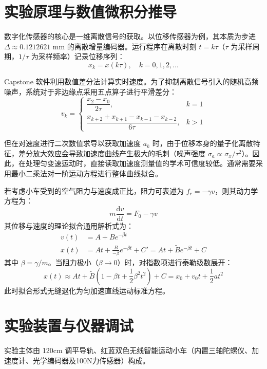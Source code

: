 \documentclass[twocolumn,zihao=5,a4paper]{ctexart} %
\begin{document}
	\section{实验原理与数值微积分推导}
	数字化传感器的核心是一维离散信号的获取。以位移传感器为例，其本质为步进 $\Delta \approx 0.1212621\text{ mm}$ 的离散增量编码器。运行程序在离散时刻 $t = k\tau$（$\tau$ 为采样周期，$1/\tau$ 为采样频率）记录位移序列：
	\begin{equation}
		x_k = x(k\tau), \quad k = 0, 1, 2, \dots
	\end{equation}
	
	Capstone 软件利用数值差分法计算实时速度。为了抑制离散信号引入的随机高频噪声，系统对于非边缘点采用五点算子进行平滑差分：
	\begin{equation}
		v_k = \begin{cases}
			\dfrac{x_2 - x_0}{2\tau}, & k = 1 \\[1em]
			\dfrac{x_{k+2} + x_{k+1} - x_{k-1} - x_{k-2}}{6\tau}, & k > 1
		\end{cases}
	\end{equation}
	
	但在对速度进行二次数值求导以获取加速度 $a_k$ 时，由于位移本身的量子化离散特征，差分放大效应会导致加速度曲线产生极大的毛刺（噪声强度 $\sigma_a \propto \sigma_x / \tau^2$）。因此，在处理匀变速运动时，直接读取加速度测量值的学术可信度较低。通常需要采用最小二乘法对一阶运动方程进行整体曲线拟合。
	
	若考虑小车受到的空气阻力与速度成正比，阻力可表述为 $f_r = -\gamma v$，则其动力学方程为：
	\begin{equation}
		m\frac{\mathrm{d}v}{\mathrm{d}t} = F_0 - \gamma v
	\end{equation}
	其位移与速度的理论拟合通用解析式为：
	\begin{align}
		v(t) &= A + Be^{-\beta t} \\
		x(t) &= At + \frac{B}{-\beta}e^{-\beta t} + C' = At + \tilde{B}e^{-\beta t} + C
	\end{align}
	其中 $\beta = \gamma/m$。当阻力极小（$\beta \to 0$）时，对指数项进行泰勒级数展开：
	\begin{equation}
		x(t) \approx At + \tilde{B}\left(1 - \beta t + \frac{1}{2}\beta^2 t^2\right) + C = x_0 + v_0 t + \frac{1}{2}at^2
	\end{equation}
	此时拟合形式无缝退化为匀加速直线运动标准方程。
	
	\section{实验装置与仪器调试}
	实验主体由 120cm 调平导轨、红蓝双色无线智能运动小车（内置三轴陀螺仪、加速度计、光学编码器及100N力传感器）构成。
	
\end{document}
